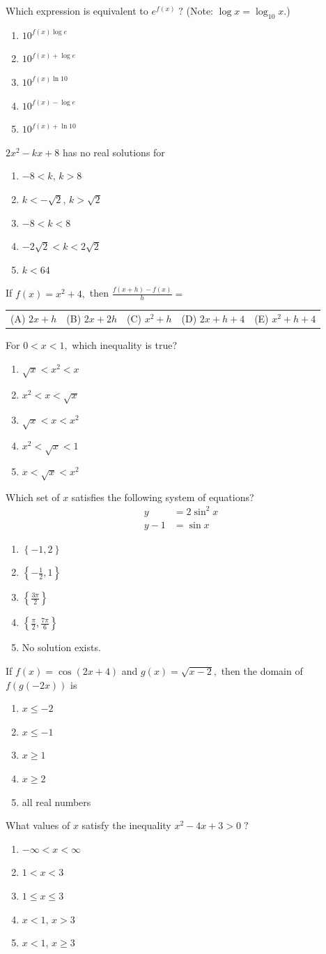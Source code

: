 \documentclass[letterstyle,12pt]{extarticle}
\newcounter{qcounter}
\newcommand{\choices}[5]{
\vspace{0.8em} 
\begin{enumerate}[label=(\Alph*)]
\setlength\itemsep{1em} 
\item
#1 
\item 
#2
\item
#3
\item
#4
\item
#5
\end{enumerate}
}
\newcommand{\choicesline}[5]{    
\vspace{2em} \break 
\begin{tabularx}{0.95 \textwidth} { 
>{\arraybackslash}X 
>{\arraybackslash}X 
>{\arraybackslash}X 
>{\arraybackslash}X 
>{\arraybackslash}X }
(A) \; #1
& 
(B) \; #2
& 
(C) \; #3
& 
(D) \; #4
&
(E) \; #5 
\end{tabularx}
\vspace{2em} \break
}
\newcommand{\ans}[1]{{\color{black} #1}}
\newenvironment{question}
    {\begin{minipage}{0.9 \textwidth}
        \item
    }
    { 
    \end{minipage} \vspace{4ex}
    }
\begin{document}
\begin{list}{\textbf{.}~}{}
\begin{question}
Which expression is equivalent to \(e^{f(x)} \; ?\) (Note: \(\log x = \log_{10} x.\)) \\
\choices
{\ans{\(10^{f(x) \log e}\)}}
{\(10^{f(x) + \log e}\)}
{\(10^{f(x) \ln 10}\)}
{\(10^{f(x) - \log e}\)}
{\(10^{f(x) + \ln 10}\)}
\end{question}

\begin{question}
\(2x^2 - kx + 8\) has no real solutions for 
\choices
{\(-8 < k, \, k > 8\)}
{\(k < - \sqrt 2, \, k > \sqrt 2\)}
{\ans{\(-8 < k < 8\)}}
{\(-2 \sqrt 2 < k < 2 \sqrt 2\)}
{\(k < 64\)}
\end{question}

\begin{question}
If \(f(x) = x^2 + 4,\) then 
\(\frac{f(x + h) - f(x)}{h} =\) \\
\choicesline
{\ans{\(2x + h\)}}
{\(2x + 2h\)}
{\(x^2 + h\)}
{\(2x + h + 4\)}
{\(x^2 + h + 4\)}
\end{question}

\begin{question}
For \(0 < x < 1,\) which inequality is true?
\choices
{\(\sqrt x < x^2 < x\)}
{\ans{\(x^2 < x < \sqrt x\)}}
{\(\sqrt x < x < x^2\)}
{\(x^2 < \sqrt x < 1\)}
{\(x < \sqrt x < x^2\)}
\end{question}

\begin{question}
Which set of \(x\) satisfies the following system of equations?
\[
\begin{aligned}
    y &= 2 \sin^2 x \\
    y - 1 &= \sin x
\end{aligned}
\]
\choices
{\(\left\{-1, 2\right\}\)}
{\(\left\{-\frac{1}{2}, 1\right\}\)}
{\(\left\{\frac{3 \pi}{2}\right\}\)}
{\ans{\(\left\{\frac{\pi}{2}, \frac{7 \pi}{6}\right\}\)}}
{No solution exists.}
\end{question}

\begin{question}
If \(f(x) = \cos(2x + 4)\) and \(g(x) = \sqrt{x - 2},\) 
then the domain of \(f(g(-2x))\) is 
\choices
{\(x \leqslant -2\)}
{\ans{\(x \leqslant -1\)}}
{\(x \geqslant 1\)}
{\(x \geqslant 2\)}
{all real numbers}
\end{question}

\begin{question}
What values of \(x\) satisfy the inequality \(x^2 - 4x + 3 > 0 \; ?\)
\choices
{\(-\infty < x < \infty\)}
{\(1 < x < 3\)}
{\(1 \leqslant x \leqslant 3\)}
{\ans{\(x < 1, \, x > 3\)}}
{\(x < 1, \, x \geqslant 3\)}
\end{question}


\end{list}
\end{document}
